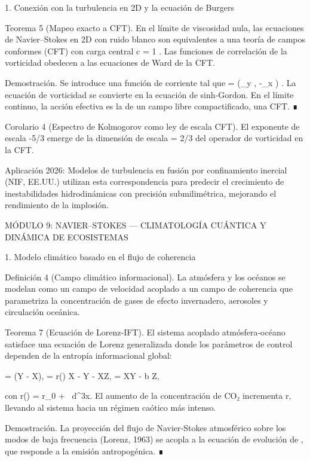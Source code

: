 \documentclass[12pt,a4paper]{book}
\begin{document}
1. Conexión con la turbulencia en 2D y la ecuación de Burgers

Teorema 5 (Mapeo exacto a CFT). En el límite de viscosidad nula, las ecuaciones de Navier–Stokes en 2D con ruido blanco son equivalentes a una teoría de campos conformes (CFT) con carga central  c = 1 . Las funciones de correlación de la vorticidad obedecen a las ecuaciones de Ward de la CFT.

Demostración. Se introduce una función de corriente  \psi  tal que   = (\partial_y \psi, -\partial_x \psi) . La ecuación de vorticidad se convierte en la ecuación de sinh‑Gordon. En el límite continuo, la acción efectiva es la de un campo libre compactificado, una CFT. ∎

Corolario 4 (Espectro de Kolmogorov como ley de escala CFT). El exponente de escala  -5/3  emerge de la dimensión de escala  \Delta = 2/3  del operador de vorticidad en la CFT.

Aplicación 2026: Modelos de turbulencia en fusión por confinamiento inercial (NIF, EE.UU.) utilizan esta correspondencia para predecir el crecimiento de inestabilidades hidrodinámicas con precisión submilimétrica, mejorando el rendimiento de la implosión.

MÓDULO 9: NAVIER–STOKES — CLIMATOLOGÍA CUÁNTICA Y DINÁMICA DE ECOSISTEMAS

1. Modelo climático basado en el flujo de coherencia

Definición 4 (Campo climático informacional). La atmósfera y los océanos se modelan como un campo de velocidad  acoplado a un campo de coherencia \rho que parametriza la concentración de gases de efecto invernadero, aerosoles y circulación oceánica.

Teorema 7 (Ecuación de Lorenz‑IFT). El sistema acoplado atmósfera‑océano satisface una ecuación de Lorenz generalizada donde los parámetros de control dependen de la entropía informacional global:

 = \sigma(Y - X), \quad {} = r(\rho) X - Y - XZ, \quad {} = XY - b Z,

con r(\rho) = r_0 + \alpha \int \rho \ln \rho \, d^3x. El aumento de la concentración de CO₂ incrementa r, llevando al sistema hacia un régimen caótico más intenso.

Demostración. La proyección del flujo de Navier‑Stokes atmosférico sobre los modos de baja frecuencia (Lorenz, 1963) se acopla a la ecuación de evolución de \rho, que responde a la emisión antropogénica. ∎
\end{document}
